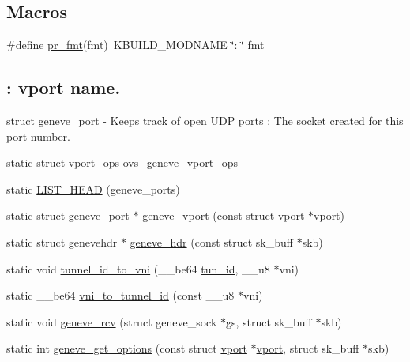 \subsection*{Macros}
\begin{DoxyCompactItemize}
\item 
\#define \hyperlink{linux_2vport-geneve_8c_a1f8c165bf4196327bc3abff648276d92}{pr\+\_\+fmt}(fmt)~K\+B\+U\+I\+L\+D\+\_\+\+M\+O\+D\+N\+A\+M\+E \char`\"{}\+: \char`\"{} fmt
\end{DoxyCompactItemize}
\subsection*{\+: vport name.}
\label{_amgrp11b33af0c85e2c8a3c03b696f666e431}%
struct \hyperlink{structgeneve__port}{geneve\+\_\+port} -\/ Keeps track of open U\+D\+P ports \+: The socket created for this port number. \begin{DoxyCompactItemize}
\item 
static struct \hyperlink{structvport__ops}{vport\+\_\+ops} \hyperlink{linux_2vport-geneve_8c_ad9b8555c118ad2e5874c3ab931390752}{ovs\+\_\+geneve\+\_\+vport\+\_\+ops}
\item 
static \hyperlink{linux_2vport-geneve_8c_aa66e082c97d7820eb9eb166e6cf4b996}{L\+I\+S\+T\+\_\+\+H\+E\+A\+D} (geneve\+\_\+ports)
\item 
static struct \hyperlink{structgeneve__port}{geneve\+\_\+port} $\ast$ \hyperlink{linux_2vport-geneve_8c_aa51b640340c7d2eaf45af423bc1e0931}{geneve\+\_\+vport} (const struct \hyperlink{structvport}{vport} $\ast$\hyperlink{structvport}{vport})
\item 
static struct genevehdr $\ast$ \hyperlink{linux_2vport-geneve_8c_ae7668c9c0c48969a65fdcc4ba3a31b6c}{geneve\+\_\+hdr} (const struct sk\+\_\+buff $\ast$skb)
\item 
static void \hyperlink{linux_2vport-geneve_8c_a50b7591d7d9bf380d0f2899042668880}{tunnel\+\_\+id\+\_\+to\+\_\+vni} (\+\_\+\+\_\+be64 \hyperlink{flow_8h_aba5027d7a3d96f0f58dd8e607365934b}{tun\+\_\+id}, \+\_\+\+\_\+u8 $\ast$vni)
\item 
static \+\_\+\+\_\+be64 \hyperlink{linux_2vport-geneve_8c_a1a4714395c3a408973e64b315af6ac35}{vni\+\_\+to\+\_\+tunnel\+\_\+id} (const \+\_\+\+\_\+u8 $\ast$vni)
\item 
static void \hyperlink{linux_2vport-geneve_8c_a0266c855cef0a46188e7bf48485171c4}{geneve\+\_\+rcv} (struct geneve\+\_\+sock $\ast$gs, struct sk\+\_\+buff $\ast$skb)
\item 
static int \hyperlink{linux_2vport-geneve_8c_a08a891b83a07b3300134c1340f329e84}{geneve\+\_\+get\+\_\+options} (const struct \hyperlink{structvport}{vport} $\ast$\hyperlink{structvport}{vport}, struct sk\+\_\+buff $\ast$skb)

\end{DoxyCompactItemize}
